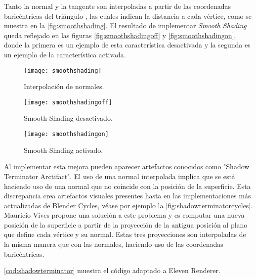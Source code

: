 Tanto la normal y la tangente son interpoladas a partir de las coordenadas baricéntricas del triángulo , las cuales indican la distancia a cada vértice, como se muestra en la \autoref{fig:smoothshading}. El resultado de implementar \emph{Smooth Shading} queda reflejado en las figuras \autoref{fig:smoothshadingoff} y \autoref{fig:smoothshadingon}, donde la primera es un ejemplo de esta característica desactivada y la segunda es un ejemplo de la característica activada.
	
\begin{figure}[H]
    \centering
	\texttt{[image: smoothshading]}
	\caption{Interpolación de normales.}
	\label{fig:smoothshading}
\end{figure}

\begin{figure}[H]
		\centering
		\begin{minipage}[b]{0.4\textwidth}
		\texttt{[image: smoothshadingoff]}
		\caption{Smooth Shading desactivado.}
		\label{fig:smoothshadingoff}
	  \end{minipage}
	  \hfill
	  \begin{minipage}[b]{0.4\textwidth}
		\texttt{[image: smoothshadingon]}
		\caption{Smooth Shading activado.}
		\label{fig:smoothshadingon}
	  \end{minipage}
	  	\hfill
\end{figure}


Al implementar esta mejora pueden aparecer artefactos conocidos como "Shadow Terminator Arctifact". El uso de una normal interpolada implica que se está haciendo uso de una normal que no coincide con la posición de la superficie. Esta discrepancia crea artefactos visuales presentes hasta en las implementaciones más actualizadas de Blender Cycles, véase por ejemplo la \autoref{fig:shadowterminatorcycles}. Mauricio Vives \cite{shadowterminatorrepo} propone una solución a este problema y es computar una nueva posición de la superficie a partir de la proyección de la antigua posición al plano que define cada vértice y su normal. Estas tres proyecciones son interpoladas de la misma manera que con las normales, haciendo uso de las coordenadas baricéntricas.
	
\autoref{cod:shadowterminator} muestra el código adaptado a Eleven Renderer.


